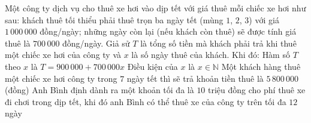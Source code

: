 \begin{ex}%
	Một công ty dịch vụ cho thuê xe hơi vào dịp tết với giá thuê mỗi chiếc xe hơi như sau: khách thuê tối thiểu phải thuê trọn ba ngày tết (mùng $1$, $2$, $3$) với giá $1\,000\,000$ đồng/ngày; những ngày còn lại (nếu khách còn thuê) sẽ được tính giá thuê là $700\,000$ đồng/ngày. Giả sử $T$ là tổng số tiền mà khách phải trả khi thuê một chiếc xe hơi của công ty và $x$ là số ngày thuê của khách. Khi đó:
	\choiceTF
	{\True Hàm số $T$ theo $x$ là $T=900\,000+700\,000x$}
	{Điều kiện của $x$ là $x \in \mathbb{N}$}
	{\True Một khách hàng thuê một chiếc xe hơi công ty trong $7$ ngày tết thì sẽ trả khoản tiền thuê là $5\,800\,000$ (đồng)}
	{Anh Bình định dành ra một khoản tối đa là $10$ triệu đồng cho phí thuê xe đi chơi trong dịp tết, khi đó anh Bình có thể thuê xe của công ty trên tối đa $12$ ngày}
\end{ex}

